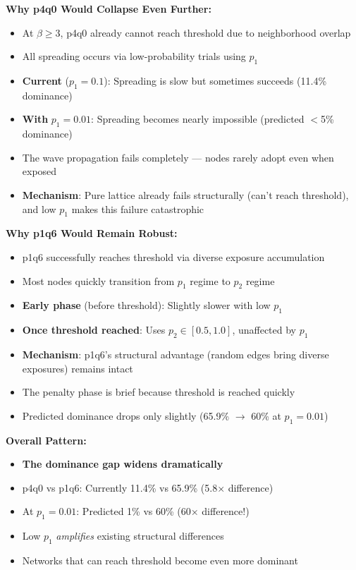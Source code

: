\documentclass[12pt,a4paper]{article}
\begin{document}
\textbf{Why p4q0 Would Collapse Even Further:}
\begin{itemize}
    \item At $\beta \geq 3$, p4q0 already cannot reach threshold due to neighborhood overlap
    \item All spreading occurs via low-probability trials using $p_1$
    \item \textbf{Current} ($p_1=0.1$): Spreading is slow but sometimes succeeds (11.4\% dominance)
    \item \textbf{With} $p_1=0.01$: Spreading becomes nearly impossible (predicted $<$5\% dominance)
    \item The wave propagation fails completely --- nodes rarely adopt even when exposed
    \item \textbf{Mechanism}: Pure lattice already fails structurally (can't reach threshold), and low $p_1$ makes this failure catastrophic
\end{itemize}

\textbf{Why p1q6 Would Remain Robust:}
\begin{itemize}
    \item p1q6 successfully reaches threshold via diverse exposure accumulation
    \item Most nodes quickly transition from $p_1$ regime to $p_2$ regime
    \item \textbf{Early phase} (before threshold): Slightly slower with low $p_1$
    \item \textbf{Once threshold reached}: Uses $p_2 \in [0.5, 1.0]$, unaffected by $p_1$
    \item \textbf{Mechanism}: p1q6's structural advantage (random edges bring diverse exposures) remains intact
    \item The penalty phase is brief because threshold is reached quickly
    \item Predicted dominance drops only slightly (65.9\% $\to$ 60\% at $p_1=0.01$)
\end{itemize}

\textbf{Overall Pattern:}
\begin{itemize}
    \item \textbf{The dominance gap widens dramatically}
    \item p4q0 vs p1q6: Currently 11.4\% vs 65.9\% (5.8× difference)
    \item At $p_1=0.01$: Predicted 1\% vs 60\% (60× difference!)
    \item Low $p_1$ \textit{amplifies} existing structural differences
    \item Networks that can reach threshold become even more dominant
\end{itemize}
\end{document}
